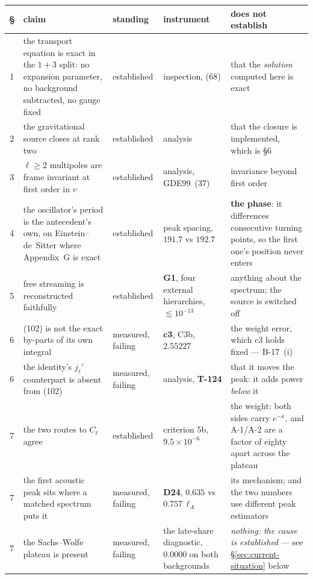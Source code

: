 \begin{center}\small
\begin{tabularx}{\textwidth}{@{}c >{\raggedright\arraybackslash}X l l >{\raggedright\arraybackslash}X@{}}
\toprule
\textbf{\S} & \textbf{claim} & \textbf{standing} & \textbf{instrument} &
  \textbf{does not establish} \\
\midrule
1 & the transport equation is exact in the $1+3$ split: no expansion
  parameter, no background subtracted, no gauge fixed & established &
  inspection, (68) & that the \emph{solution} computed here is exact \\
2 & the gravitational source closes at rank two & established & analysis &
  that the closure is implemented, which is \S6 \\
3 & $\ell\ge2$ multipoles are frame invariant at first order in $v$ &
  established & analysis, GDE99~(37) & invariance beyond first order \\
4 & the oscillator's period is the antecedent's own, on Einstein--de~Sitter
  where Appendix~G is exact & established & peak spacing, $191.7$ vs $192.7$ &
  \textbf{the phase}: it differences consecutive turning points, so the first
  one's position never enters \\
5 & free streaming is reconstructed faithfully & established & \textbf{G1},
  four external hierarchies, $\lesssim10^{-13}$ & anything about the spectrum;
  the source is switched off \\
6 & (102) is not the exact by-parts of its own integral & measured, failing &
  \textbf{c3}, C3b, $2.55227$ & the weight error, which c3 holds fixed ---
  B-17~(i) \\
6 & the identity's $j_\ell'$ counterpart is absent from (102) & measured,
  failing & analysis, \textbf{T-124} & that it moves the peak: it adds power
  \emph{below} it \\
7 & the two routes to $C_\ell$ agree & established & criterion 5b,
  $9.5\times10^{-6}$ & the weight: both sides carry $e^{-\kappa}$, and A-1/A-2
  are a factor of eighty apart across the plateau \\
7 & the first acoustic peak sits where a matched spectrum puts it &
  measured, failing & \textbf{D24}, $0.635$ vs $0.757\,\ell_A$ & its
  mechanism; and the two numbers use different peak estimators \\
7 & the Sachs--Wolfe plateau is present & measured, failing & the late-share
  diagnostic, $0.0000$ on both backgrounds & \emph{nothing: the cause is
  established} --- see \S\ref{sec:current-situation} below \\
\bottomrule
\end{tabularx}
\end{center}

